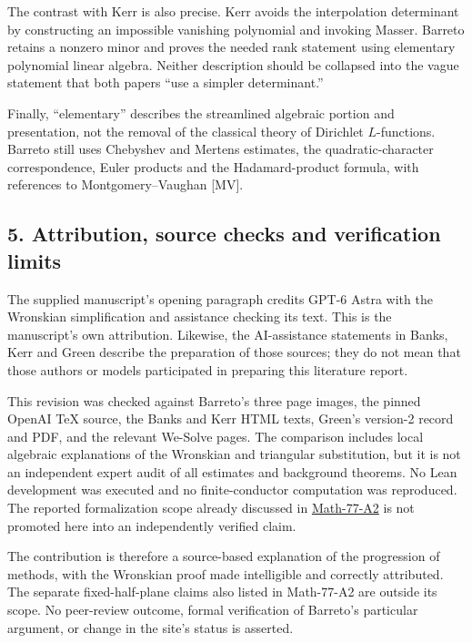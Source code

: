 \documentclass[11pt]{article}
\begin{document}
The contrast with Kerr is also precise. Kerr avoids the interpolation determinant by constructing an impossible vanishing polynomial and invoking Masser. Barreto retains a nonzero minor and proves the needed rank statement using elementary polynomial linear algebra. Neither description should be collapsed into the vague statement that both papers ``use a simpler determinant.''

Finally, ``elementary'' describes the streamlined algebraic portion and presentation, not the removal of the classical theory of Dirichlet \(L\)-functions. Barreto still uses Chebyshev and Mertens estimates, the quadratic-character correspondence, Euler products and the Hadamard-product formula, with references to Montgomery--Vaughan {[}MV{]}.

\subsection{5. Attribution, source checks and verification limits}\label{attribution-source-checks-and-verification-limits}

The supplied manuscript's opening paragraph credits GPT-6 Astra with the Wronskian simplification and assistance checking its text. This is the manuscript's own attribution. Likewise, the AI-assistance statements in Banks, Kerr and Green describe the preparation of those sources; they do not mean that those authors or models participated in preparing this literature report.

This revision was checked against Barreto's three page images, the pinned OpenAI TeX source, the Banks and Kerr HTML texts, Green's version-2 record and PDF, and the relevant We-Solve pages. The comparison includes local algebraic explanations of the Wronskian and triangular substitution, but it is not an independent expert audit of all estimates and background theorems. No Lean development was executed and no finite-conductor computation was reproduced. The reported formalization scope already discussed in \href{https://we-solve.github.io/contributions/siegel-zeros/attempt-2/r1/}{Math-77-A2} is not promoted here into an independently verified claim.

The contribution is therefore a source-based explanation of the progression of methods, with the Wronskian proof made intelligible and correctly attributed. The separate fixed-half-plane claims also listed in Math-77-A2 are outside its scope. No peer-review outcome, formal verification of Barreto's particular argument, or change in the site's status is asserted.
\end{document}
